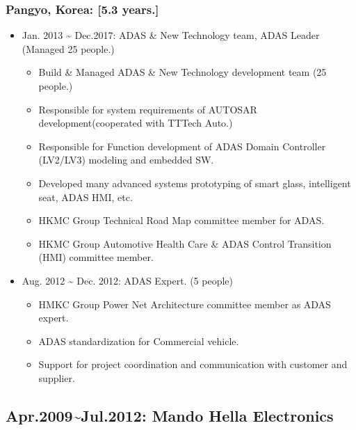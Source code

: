 \documentclass[12pt,a4paper]{article}
\begin{document}
\subsubsection{Pangyo, Korea: [5.3 years.]}
\begin{itemize}
\item Jan. 2013 {\textasciitilde} Dec.2017: ADAS \& New Technology team, ADAS Leader (Managed 25 people.)

\begin{itemize}
\item Build \& Managed ADAS \& New Technology development team (25 people.)


\item Responsible for system requirements of AUTOSAR development(cooperated with TTTech Auto.)


\item Responsible for Function development of ADAS Domain Controller (LV2/LV3) modeling and embedded SW.


\item Developed many advanced systems prototyping of smart glass, intelligent seat, ADAS HMI, etc.


\item HKMC Group Technical Road Map committee member for ADAS.


\item HKMC Group Automotive Health Care \& ADAS Control Transition (HMI) committee member.

\end{itemize}

\item Aug. 2012 {\textasciitilde} Dec. 2012: ADAS Expert. (5 people)

\begin{itemize}
\item HMKC Group Power Net Architecture committee member as ADAS expert.


\item ADAS standardization for Commercial vehicle.


\item Support for project coordination and communication with customer and supplier.

\end{itemize}
\end{itemize}
\subsection{Apr.2009{\textasciitilde}Jul.2012: Mando Hella Electronics}
\end{document}
